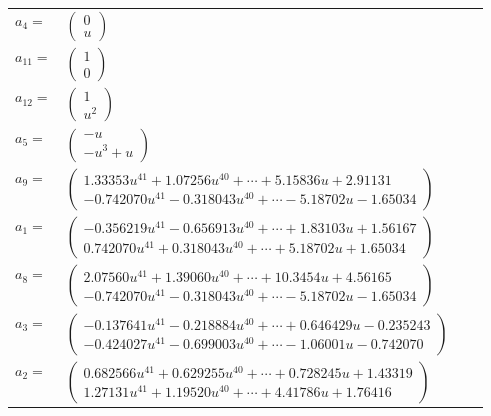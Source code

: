 \documentclass[1p]{elsarticle_modified}
\theoremstyle{definition}
\begin{document}
\begin{tabular}{m{7pt} m{180pt} m{7pt} m{180pt} }
\flushright $a_{4}=$&$\begin{pmatrix}0\\u\end{pmatrix}$ \\
\flushright $a_{11}=$&$\begin{pmatrix}1\\0\end{pmatrix}$ \\
\flushright $a_{12}=$&$\begin{pmatrix}1\\u^2\end{pmatrix}$ \\
\flushright $a_{5}=$&$\begin{pmatrix}- u\\- u^3+u\end{pmatrix}$ \\
\flushright $a_{9}=$&$\begin{pmatrix}1.33353 u^{41}+1.07256 u^{40}+\cdots+5.15836 u+2.91131\\-0.742070 u^{41}-0.318043 u^{40}+\cdots-5.18702 u-1.65034\end{pmatrix}$ \\
\flushright $a_{1}=$&$\begin{pmatrix}-0.356219 u^{41}-0.656913 u^{40}+\cdots+1.83103 u+1.56167\\0.742070 u^{41}+0.318043 u^{40}+\cdots+5.18702 u+1.65034\end{pmatrix}$ \\
\flushright $a_{8}=$&$\begin{pmatrix}2.07560 u^{41}+1.39060 u^{40}+\cdots+10.3454 u+4.56165\\-0.742070 u^{41}-0.318043 u^{40}+\cdots-5.18702 u-1.65034\end{pmatrix}$ \\
\flushright $a_{3}=$&$\begin{pmatrix}-0.137641 u^{41}-0.218884 u^{40}+\cdots+0.646429 u-0.235243\\-0.424027 u^{41}-0.699003 u^{40}+\cdots-1.06001 u-0.742070\end{pmatrix}$ \\
\flushright $a_{2}=$&$\begin{pmatrix}0.682566 u^{41}+0.629255 u^{40}+\cdots+0.728245 u+1.43319\\1.27131 u^{41}+1.19520 u^{40}+\cdots+4.41786 u+1.76416\end{pmatrix}$ \\

\end{tabular}
\end{document}
